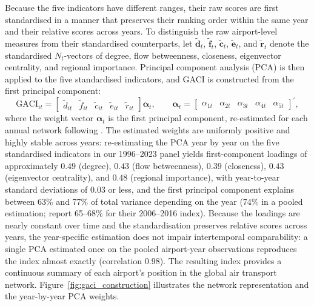 Because the five indicators have different ranges, their raw scores are first standardised in a manner that preserves their ranking order within the same year and their relative scores across years. To distinguish the raw airport-level measures from their standardised counterparts, let $\tilde{\mathbf{d}}_t$, $\tilde{\mathbf{f}}_t$, $\tilde{\mathbf{c}}_t$, $\tilde{\mathbf{e}}_t$, and $\tilde{\mathbf{r}}_t$ denote the standardised $N_t$-vectors of degree, flow betweenness, closeness, eigenvector centrality, and regional importance. Principal component analysis (PCA) is then applied to the five standardised indicators, and GACI is constructed from the first principal component:
\begin{equation}
    \mathrm{GACI}_{it}
    =
    \begin{bmatrix}
        \tilde{d}_{it} & \tilde{f}_{it} & \tilde{c}_{it} & \tilde{e}_{it} & \tilde{r}_{it}
    \end{bmatrix}
    \boldsymbol{\alpha}_t,
    \qquad
    \boldsymbol{\alpha}_t
    =
    \begin{bmatrix}
        \alpha_{1t} &
        \alpha_{2t} &
        \alpha_{3t} &
        \alpha_{4t} &
        \alpha_{5t}
    \end{bmatrix}^{\prime},
    \label{eq:gaci_pca}
\end{equation}
where the weight vector $\boldsymbol{\alpha}_t$ is the first principal component, re-estimated for each annual network following \citet{Cheung_2020}. The estimated weights are uniformly positive and highly stable across years: re-estimating the PCA year by year on the five standardised indicators in our 1996--2023 panel yields first-component loadings of approximately $0.49$ (degree), $0.43$ (flow betweenness), $0.39$ (closeness), $0.43$ (eigenvector centrality), and $0.48$ (regional importance), with year-to-year standard deviations of $0.03$ or less, and the first principal component explains between 63\% and 77\% of total variance depending on the year (74\% in a pooled estimation; \citealt{Cheung_2020} report 65--68\% for their 2006--2016 index). Because the loadings are nearly constant over time and the standardisation preserves relative scores across years, the year-specific estimation does not impair intertemporal comparability: a single PCA estimated once on the pooled airport-year observations reproduces the index almost exactly (correlation $0.98$). The resulting index provides a continuous summary of each airport's position in the global air transport network. Figure~\ref{fig:gaci_construction} illustrates the network representation and the year-by-year PCA weights.

